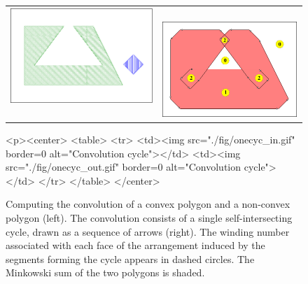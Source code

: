 \begin{figure}[t]
  \begin{ccTexOnly}
    \begin{center}
      \begin{tabular}{c c}
        \includegraphics{Minkowski_sum_2/fig/onecyc_in} ~&~
        \includegraphics{Minkowski_sum_2/fig/onecyc_out}
      \end{tabular}
    \end{center}
  \end{ccTexOnly}
  \begin{ccHtmlOnly}
    <p><center>
    <table>
    <tr>
    <td><img src="./fig/onecyc_in.gif" border=0 alt="Convolution cycle"></td>
    <td><img src="./fig/onecyc_out.gif" border=0 alt="Convolution cycle"></td>
    </tr>
    </table>
    </center>
  \end{ccHtmlOnly}
\caption{Computing the convolution of a convex polygon and a
non-convex polygon (left). The convolution consists of a single
self-intersecting cycle, drawn as a sequence of arrows (right).
The winding number associated with each face of the arrangement
induced by the segments forming the cycle appears in dashed circles.
The Minkowski sum of the two polygons is shaded.}
\label{mink_fig:onecyc}
\end{figure}

